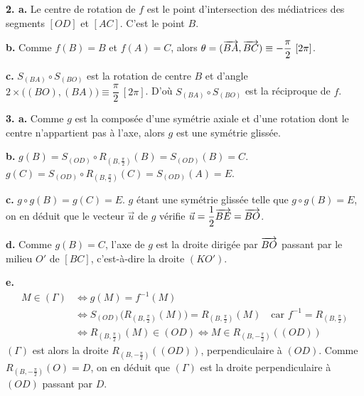 \documentclass[11pt]{article}
\begin{document}
\begin{center}
\end{center}

\textbf{2. a.} Le centre de rotation de $f$ est le point d'intersection des médiatrices des segments $[OD]$ et $[AC]$. C'est le point $B$.

\textbf{b.} Comme $f(B) = B$ et $f(A) = C$, alors $\theta = (\overrightarrow{BA}, \overrightarrow{BC}) \equiv -\dfrac{\pi}{2}\ [2\pi]$.

\textbf{c.} $S_{(BA)} \circ S_{(BO)}$ est la rotation de centre $B$ et d'angle $2 \times \big((BO),(BA)\big) \equiv \dfrac{\pi}{2}\ [2\pi]$. D'où $S_{(BA)} \circ S_{(BO)}$ est la réciproque de $f$.

\textbf{3. a.} Comme $g$ est la composée d'une symétrie axiale et d'une rotation dont le centre n'appartient pas à l'axe, alors $g$ est une symétrie glissée.

\textbf{b.} $g(B) = S_{(OD)} \circ R_{(B,\frac{\pi}{2})}(B) = S_{(OD)}(B) = C$. $g(C) = S_{(OD)} \circ R_{(B,\frac{\pi}{2})}(C) = S_{(OD)}(A) = E$.

\textbf{c.} $g \circ g(B) = g(C) = E$. $g$ étant une symétrie glissée telle que $g \circ g(B) = E$, on en déduit que le vecteur $\vec{u}$ de $g$ vérifie $\vec{u} = \dfrac{1}{2}\overrightarrow{BE} = \overrightarrow{BO}$.

\textbf{d.} Comme $g(B) = C$, l'axe de $g$ est la droite dirigée par $\overrightarrow{BO}$ passant par le milieu $O'$ de $[BC]$, c'est-à-dire la droite $(KO')$.

\textbf{e.}
\begin{align*}
M \in (\Gamma) &\Longleftrightarrow g(M) = f^{-1}(M) \\
&\Longleftrightarrow S_{(OD)}\big(R_{(B,\frac{\pi}{2})}(M)\big) = R_{(B,\frac{\pi}{2})}(M) \quad \text{car } f^{-1} = R_{(B,\frac{\pi}{2})} \\
&\Longleftrightarrow R_{(B,\frac{\pi}{2})}(M) \in (OD) \Longleftrightarrow M \in R_{(B,-\frac{\pi}{2})}((OD))
\end{align*}
$(\Gamma)$ est alors la droite $R_{(B,-\frac{\pi}{2})}((OD))$, perpendiculaire à $(OD)$. Comme $R_{(B,-\frac{\pi}{2})}(O) = D$, on en déduit que $(\Gamma)$ est la droite perpendiculaire à $(OD)$ passant par $D$.
\end{document}
